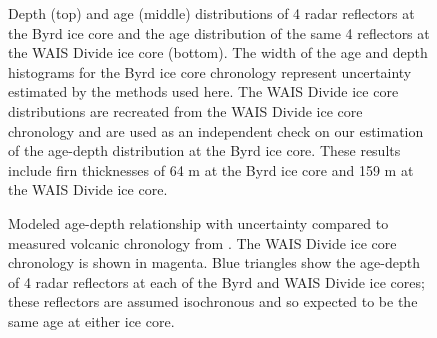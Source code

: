 \begin{figure}[h]
\centering
{}
\caption[]{Depth (top) and age (middle) distributions of 4 radar reflectors at the Byrd ice core and the age distribution of the same 4 reflectors at the WAIS Divide ice core (bottom). The width of the age and depth histograms for the Byrd ice core chronology represent uncertainty estimated by the methods used here. The WAIS Divide ice core distributions are recreated from the WAIS Divide ice core chronology \cite{buizert2015} and are used as an independent check on our estimation of the age-depth distribution at the Byrd ice core. These results include firn thicknesses of 64 m at the Byrd ice core and 159 m at the WAIS Divide ice core.}
\label{fig:layer_histo}
\end{figure}

\begin{figure}[h]
\centering
{}
\caption[]{Modeled age-depth relationship with uncertainty compared to measured volcanic chronology from \citet[open circles;][]{hammer1997}. The WAIS Divide ice core chronology \citep{buizert2015} is shown in magenta. Blue triangles show the age-depth of 4 radar reflectors at each of the Byrd and WAIS Divide ice cores; these reflectors are assumed isochronous and so expected to be the same age at either ice core.}
\label{fig:spaghetti}
\end{figure}